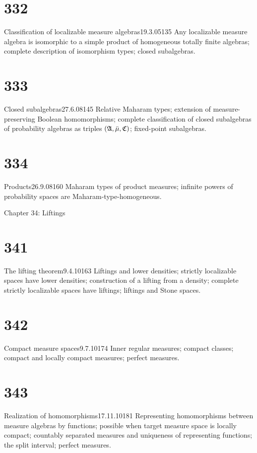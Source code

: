 \section{332}{Classification of localizable measure
algebras}{19.3.05}{135}{}
{Any localizable measure algebra is isomorphic to a simple product
of homogeneous totally finite algebras;  complete description of
isomorphism types;  closed subalgebras.}
     
\section{333}{Closed subalgebras}{27.6.08}{145}{}
{Relative Maharam types;  extension of measure-preserving Boolean
homomorphisms;  complete classification of closed subalgebras of
probability algebras as triples $(\frak{A},\bar\mu,\frak{C})$;  fixed-point
subalgebras.}
     
\section{334}{Products}{26.9.08}{160}{}
{Maharam types of product measures;  infinite powers of probability spaces
are Maharam-type-homogeneous.}
     
     
 Chapter 34:  Liftings
     
     
\section{341}{The lifting theorem}{9.4.10}{163}{}
{Liftings and lower densities;  strictly localizable spaces have
lower densities;  construction of a lifting from a density;  complete
strictly localizable spaces have liftings;  liftings and Stone spaces.}
     
\section{342}{Compact measure spaces}{9.7.10}{174}{}
{Inner regular measures;  compact classes;  compact and locally
compact measures;  perfect measures.}
     
\section{343}{Realization of homomorphisms}{17.11.10}{181}{}
{Representing homomorphisms between measure algebras by functions;
possible when target measure space is locally compact;  countably
separated measures and uniqueness of representing functions;  the split
interval;  perfect measures.}
     
